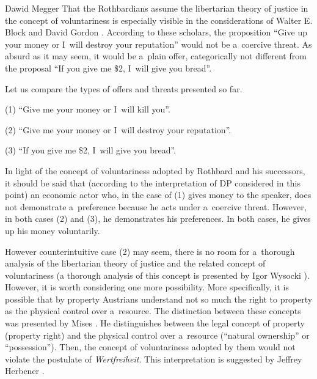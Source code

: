 \begin{artengenv}{Dawid Megger}
That the Rothbardians assume the libertarian theory of justice in the concept of voluntariness is especially visible in the considerations of Walter E. Block and David Gordon 
\parencite*[][]{block_blackmail_1985}. %
 According to these scholars, the proposition ``Give up your money or I~will destroy your reputation'' would not be a~coercive threat. As absurd as it may seem, it would be a~plain offer, categorically not different from the proposal ``If you give me \$2, I~will give you bread''.



Let us compare the types of offers and threats presented so far.

\medskip

\noindent (1) ``Give me your money or I~will kill you''.



\noindent (2) ``Give me your money or I~will destroy your reputation''.



\noindent (3) ``If you give me \$2, I~will give you bread''.

\medskip

In light of the concept of voluntariness adopted by Rothbard and his successors, it should be said that (according to the interpretation of DP considered in this point) an economic actor who, in the case of (1) gives money to the speaker, does not demonstrate a~preference because he acts under a~coercive threat. However, in both cases (2) and (3), he demonstrates his preferences. In both cases, he gives up his money voluntarily.



However counterintuitive case (2) may seem, there is no room for a~thorough analysis of the libertarian theory of justice and the related concept of voluntariness (a thorough analysis of this concept is presented by Igor Wysocki 
\parencite*[][]{wysocki_austro-libertarian_2021}%
). However, it is worth considering one more possibility. More specifically, it is possible that by property Austrians understand not so much the right to property as the physical control over a~resource. The distinction between these concepts was presented by Mises 
\parencite*[][pp.37–39]{mises_socialism_1962}. %
 He distinguishes between the legal concept of property (property right) and the physical control over a~resource (``natural ownership'' or ``possession''). Then, the concept of voluntariness adopted by them would not violate the postulate of \textit{Wertfreiheit}. This interpretation is suggested by Jeffrey Herbener 
\parencite*[][p.99]{herbener_pareto_1997}.%





\end{artengenv}
